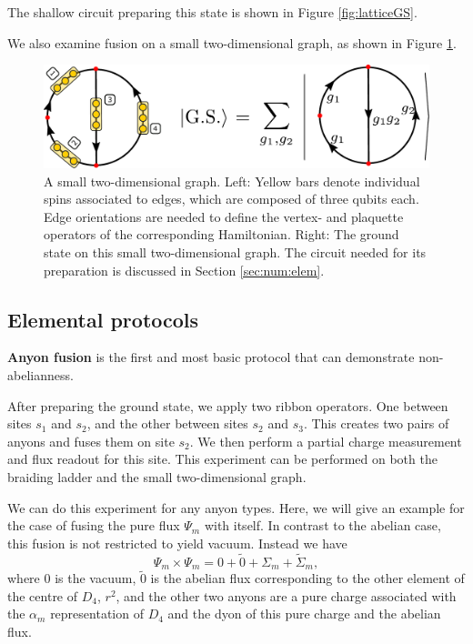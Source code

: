 \documentclass[a4paper,twocolumn,11pt, accepted=2024-06-14]{quantumarticle}
\begin{document}
The shallow circuit preparing this state is shown in Figure \ref{fig:latticeGS}.

We also examine fusion on a small two-dimensional graph, as shown in Figure \ref{fig:basketball}.

\begin{figure}
    \centering
    \includegraphics[width=\linewidth]{Figures/basketball.pdf}
    \caption{A small two-dimensional graph. Left: Yellow bars denote individual spins associated to edges, which are composed of three qubits each. Edge orientations are needed to define the vertex- and plaquette operators of the corresponding Hamiltonian. Right: The ground state on this small two-dimensional graph. The circuit needed for its preparation is discussed in Section \ref{sec:num:elem}.}
    \label{fig:basketball}
\end{figure}




\subsection{Elemental protocols}
\textbf{Anyon fusion}
is the first and most basic protocol that can demonstrate non-abelianness. 

After preparing the ground state, we apply two ribbon operators. One between sites $s_1$ and $s_2$, and the other between sites $s_2$ and $s_3$.
This creates two pairs of anyons and fuses them on site $s_2$. We then perform a partial charge measurement and flux readout for this site.
This experiment can be performed on both the braiding ladder and the small two-dimensional graph.

We can do this experiment for any anyon types. Here, we will give an example for the case of fusing the pure flux $\Psi_m$ with itself. In contrast to the abelian case, this fusion is not restricted to yield vacuum. Instead we have
$$\Psi_m \times \Psi_m = 0 + \tilde{0} + \Sigma_m + \tilde{\Sigma}_m,$$ where $0$ is the vacuum, $\tilde{0}$ is the abelian flux corresponding to the other element of the centre of $D_4$, $r^2$, and the other two anyons are a pure charge associated with the $\alpha_m$ representation of $D_4$ and the dyon of this pure charge and the abelian flux.
\end{document}
